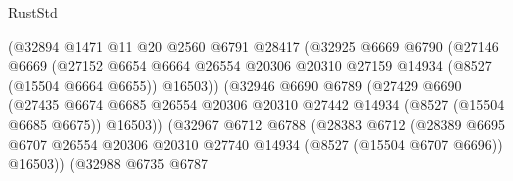\begin{lexlean}{RustStd}
\begin{coremodule}
                                (@32894
                                  @1471
                                  @11
                                  @20
                                  @2560
                                  @6791
                                  @28417
                                  (@32925
                                    @6669
                                    @6790
                                    (@27146
                                      @6669
                                      (@27152
                                        @6654
                                        @6664
                                        @26554
                                        @20306
                                        @20310
                                        @27159
                                        @14934
                                        (@8527 (@15504 @6664 @6655))
                                        @16503))
                                    (@32946
                                      @6690
                                      @6789
                                      (@27429
                                        @6690
                                        (@27435
                                          @6674
                                          @6685
                                          @26554
                                          @20306
                                          @20310
                                          @27442
                                          @14934
                                          (@8527 (@15504 @6685 @6675))
                                          @16503))
                                      (@32967
                                        @6712
                                        @6788
                                        (@28383
                                          @6712
                                          (@28389
                                            @6695
                                            @6707
                                            @26554
                                            @20306
                                            @20310
                                            @27740
                                            @14934
                                            (@8527 (@15504 @6707 @6696))
                                            @16503))
                                        (@32988
                                          @6735
                                          @6787

\end{coremodule}
\end{lexlean}
